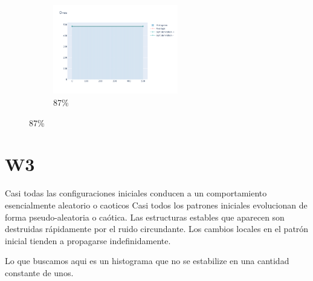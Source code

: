 \documentclass[12pt, fleqn]{report}                             %
\theoremstyle{break}                                            %
\begin{document}
\begin{figure}[ht!]
\begin{subfigure}[b]{0.4\linewidth}
          \includegraphics[width=0.6\textwidth]{Images/232/dia-d.png}
          \caption{87\%}
        \end{subfigure}
      \end{figure}






















      \clearpage
      \section{W3}


      Casi todas las configuraciones iniciales conducen a un comportamiento esencialmente aleatorio o caoticos
      Casi todos los patrones iniciales evolucionan de forma pseudo-aleatoria o caótica.
       Las estructuras estables que aparecen son destruidas rápidamente por el ruido circundante. 
       Los cambios locales en el patrón inicial tienden a propagarse indefinidamente.

       Lo que buscamos aqui es un histograma que no se estabilize en una cantidad constante de unos.
            
\end{document}
